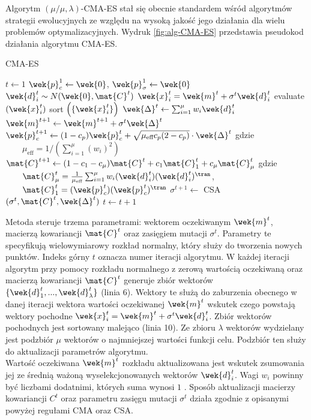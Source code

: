    Algorytm $(\mu/\mu, \lambda)$-CMA-ES stał się obecnie standardem wśród algorytmów strategii ewolucyjnych ze względu na wysoką jakość jego działania dla wielu problemów optymalizacyjnych. Wydruk \ref{fig:alg-CMA-ES} przedstawia pseudokod działania algorytmu CMA-ES. 
  \begin{algorithm}
  \renewcommand{\thealgorithm}{}
  \caption{CMA-ES} 
  \label{fig:alg-CMA-ES}
  \begin{algorithmic}[1]
  \STATE $t \gets 1$
    \STATE $\wek{p}_c^1 \gets \wek{0}$, $\wek{p}_\sigma^1 \gets \wek{0}$
      \STATE $ \wek{d}_i^t \sim N(\wek{0}, \mat{C}^t) $
      \STATE $\wek{x}_i^t=\wek{m}^{t} + \sigma^t \wek{d}_i^t $
      \STATE evaluate $(\wek{x}_i^t)$
   \ENDFOR
   \STATE sort $ \left(\{ \wek{x}_i^t \} \right) $
   \STATE $\wek{\Delta}^{t} \gets \sum_{i=1}^\mu w_i \wek{d}_i^t $
   \STATE $\wek{m}^{t+1} \gets \wek{m}^{t+1} + \sigma^t \wek{\Delta}^{t} $
   \STATE $\wek{p}_c^{t+1} \gets (1-c_p)\wek{p}_c^t + \sqrt{\mu_\text{eff} c_p(2-c_p)} \cdot \wek{\Delta}^{t}$ gdzie \newline
          $\qquad \mu_\text{eff}=1/\left(\sum_{i=1}^\mu (w_i)^2\right)$
   \STATE $\mat{C}^{t+1} \gets (1-c_1-c_\mu)\mat{C}^t + c_1 \mat{C}^t_1 + c_\mu  \mat{C}^t_\mu$ gdzie \newline
$\qquad \mat{C}_\mu^t=\frac{1}{\mu_\text{eff}}\sum_{i=1}^\mu w_i(\wek{d}_i^t)(\wek{d}_i^t)^\tran$, \newline
$\qquad \mat{C}_1^t=(\wek{p}_c^t)(\wek{p}_c^t)^\tran$
   \STATE $\sigma^{t+1} \gets $ CSA $(\sigma^t, \mat{C}^{t}, \wek{\Delta}^{t})$ 
   \STATE $t \gets t+1$
\ENDWHILE
\end{algorithmic}
\end{algorithm} 
     Metoda steruje trzema parametrami: wektorem oczekiwanym $\wek{m}^{t}$, macierzą kowariancji
    $\mat{C}^t$ oraz zasięgiem mutacji $\sigma^t$. Parametry te specyfikują wielowymiarowy rozkład normalny, który służy do tworzenia nowych punktów. Indeks górny $t$ oznacza numer iteracji algorytmu.
    W każdej iteracji algorytm przy pomocy rozkładu normalnego z zerową wartością oczekiwaną oraz macierzą kowariancji $\mat{C}^t$ generuje zbiór wektorów $\{\wek{d}_1^t,...,\wek{d}_\lambda^t\}$ (linia 6). 
    Wektory te służą do zaburzenia obecnego w danej iteracji wektora wartości oczekiwanej $\wek{m}^t$ wskutek czego powstają wektory pochodne $\wek{x}^t_i=\wek{m}^t+\sigma^t \wek{d}_i^t$.
    Zbiór wektorów pochodnych jest sortowany malejąco (linia 10). Ze zbioru $\lambda$ wektorów wydzielany jest podzbiór $\mu$ wektorów o najmniejszej wartości funkcji celu. Podzbiór ten służy do
    aktualizacji parametrów algorytmu. \\
    Wartość oczekiwana $\wek{m}^t$ rozkładu aktualizowana jest wskutek zsumowania jej ze średnią ważoną wyselekcjonowanych wektorów $\wek{d}_{i}^{t}$. Wagi $w_{i}$ powinny być liczbami dodatnimi, których suma wynosi $1$ \cite{Hansen:2001}.
    Sposób aktualizacji macierzy kowariancji $C^{t}$ oraz parametru zasięgu mutacji $\sigma^{t}$ działa zgodnie z opisanymi powyżej regułami CMA oraz CSA.
